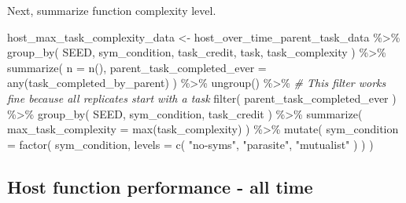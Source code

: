 \documentclass[
]{book}
\newenvironment{Shaded}{\begin{snugshade}}{\end{snugshade}}
\newcommand{\AttributeTok}[1]{\textcolor[rgb]{0.77,0.63,0.00}{#1}}
\newcommand{\CommentTok}[1]{\textcolor[rgb]{0.56,0.35,0.01}{\textit{#1}}}
\newcommand{\FunctionTok}[1]{\textcolor[rgb]{0.00,0.00,0.00}{#1}}
\newcommand{\NormalTok}[1]{#1}
\newcommand{\OtherTok}[1]{\textcolor[rgb]{0.56,0.35,0.01}{#1}}
\newcommand{\SpecialCharTok}[1]{\textcolor[rgb]{0.00,0.00,0.00}{#1}}
\newcommand{\StringTok}[1]{\textcolor[rgb]{0.31,0.60,0.02}{#1}}
\begin{document}
Next, summarize function complexity level.

\begin{Shaded}
\begin{Highlighting}[]
\NormalTok{host\_max\_task\_complexity\_data }\OtherTok{\textless{}{-}}\NormalTok{ host\_over\_time\_parent\_task\_data }\SpecialCharTok{\%\textgreater{}\%}
  \FunctionTok{group\_by}\NormalTok{(}
\NormalTok{    SEED,}
\NormalTok{    sym\_condition,}
\NormalTok{    task\_credit,}
\NormalTok{    task,}
\NormalTok{    task\_complexity}
\NormalTok{  ) }\SpecialCharTok{\%\textgreater{}\%}
  \FunctionTok{summarize}\NormalTok{(}
    \AttributeTok{n =} \FunctionTok{n}\NormalTok{(),}
    \AttributeTok{parent\_task\_completed\_ever =} \FunctionTok{any}\NormalTok{(task\_completed\_by\_parent)}
\NormalTok{  ) }\SpecialCharTok{\%\textgreater{}\%}
  \FunctionTok{ungroup}\NormalTok{() }\SpecialCharTok{\%\textgreater{}\%}
  \CommentTok{\# This filter works fine because all replicates start with a task}
  \FunctionTok{filter}\NormalTok{(}
\NormalTok{    parent\_task\_completed\_ever}
\NormalTok{  ) }\SpecialCharTok{\%\textgreater{}\%}
  \FunctionTok{group\_by}\NormalTok{(}
\NormalTok{    SEED,}
\NormalTok{    sym\_condition,}
\NormalTok{    task\_credit}
\NormalTok{  ) }\SpecialCharTok{\%\textgreater{}\%}
  \FunctionTok{summarize}\NormalTok{(}
    \AttributeTok{max\_task\_complexity =} \FunctionTok{max}\NormalTok{(task\_complexity)}
\NormalTok{  ) }\SpecialCharTok{\%\textgreater{}\%}
  \FunctionTok{mutate}\NormalTok{(}
    \AttributeTok{sym\_condition =} \FunctionTok{factor}\NormalTok{(}
\NormalTok{      sym\_condition,}
      \AttributeTok{levels =} \FunctionTok{c}\NormalTok{(}
        \StringTok{"no{-}syms"}\NormalTok{,}
        \StringTok{"parasite"}\NormalTok{,}
        \StringTok{"mutualist"}
\NormalTok{      )}
\NormalTok{    )}
\NormalTok{  )}
\end{Highlighting}
\end{Shaded}

\hypertarget{host-function-performance---all-time-5}{%
\subsection{Host function performance - all time}\label{host-function-performance---all-time-5}}
\end{document}

